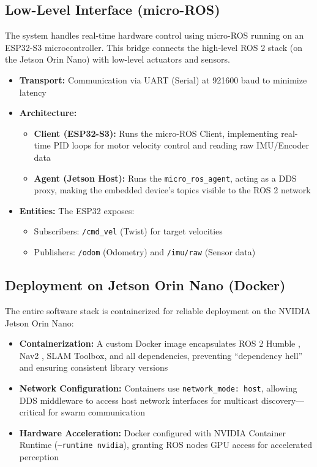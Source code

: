 \subsection{Low-Level Interface (micro-ROS)}

The system handles real-time hardware control using micro-ROS running on an ESP32-S3 microcontroller. This bridge connects the high-level ROS 2 stack (on the Jetson Orin Nano) with low-level actuators and sensors.

\begin{itemize}
    \item \textbf{Transport:} Communication via UART (Serial) at 921600 baud to minimize latency
    \item \textbf{Architecture:}
    \begin{itemize}
        \item \textbf{Client (ESP32-S3):} Runs the micro-ROS Client, implementing real-time PID loops for motor velocity control and reading raw IMU/Encoder data
        \item \textbf{Agent (Jetson Host):} Runs the \texttt{micro\_ros\_agent}, acting as a DDS proxy, making the embedded device's topics visible to the ROS 2 network
    \end{itemize}
    \item \textbf{Entities:} The ESP32 exposes:
    \begin{itemize}
        \item Subscribers: \texttt{/cmd\_vel} (Twist) for target velocities
        \item Publishers: \texttt{/odom} (Odometry) and \texttt{/imu/raw} (Sensor data)
    \end{itemize}
\end{itemize}

\subsection{Deployment on Jetson Orin Nano (Docker)}

The entire software stack is containerized for reliable deployment on the NVIDIA Jetson Orin Nano:

\begin{itemize}
    \item \textbf{Containerization:} A custom Docker image encapsulates ROS 2 Humble \cite{ros2design2020}, Nav2 \cite{nav2docs, macenski2020marathon2}, SLAM Toolbox, and all dependencies, preventing ``dependency hell'' and ensuring consistent library versions
    \item \textbf{Network Configuration:} Containers use \texttt{network\_mode: host}, allowing DDS middleware to access host network interfaces for multicast discovery---critical for swarm communication
    \item \textbf{Hardware Acceleration:} Docker configured with NVIDIA Container Runtime (\texttt{--runtime nvidia}), granting ROS nodes GPU access for accelerated perception
\end{itemize}

